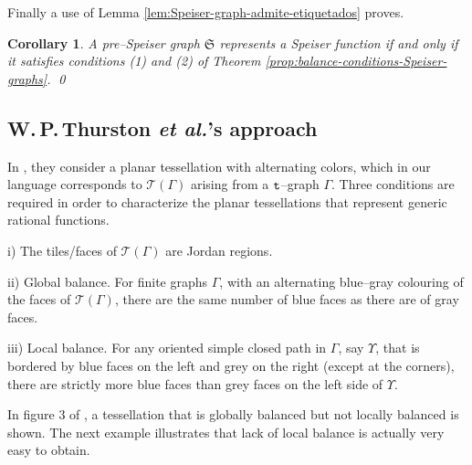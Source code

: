 \documentclass[final,3p,times]{elsarticle}
\newtheorem{corollary}[theorem]{Corollary}
\theoremstyle{definition}
\begin{document}
Finally a use of Lemma \ref{lem:Speiser-graph-admite-etiquetados} proves.

\begin{corollary}
A pre--Speiser graph $\mathfrak{S}$ represents a Speiser function
if and only if it satisfies conditions (1) and (2) of 
Theorem \ref{prop:balance-conditions-Speiser-graphs}.
\hfill\qed
\end{corollary}


\subsection{W.\,P.\,Thurston \emph{et al.}'s approach}
\label{sec:Koch-Lei}
In \cite{Koch-Lei}, they consider a planar tessellation with alternating colors, 
which in our language corresponds to
$\mathscr{T}(\Gamma)$ arising from a $\tt t$--graph 
$\Gamma$.
Three conditions are required 
in order to 
characterize the planar
tessellations that represent generic
rational functions.

\noindent 
i) The tiles/faces of $\mathscr{T}(\Gamma)$ 
are Jordan regions.

\noindent 
ii) Global balance. 
For finite graphs $\Gamma$, 
with an alternating blue--gray 
colouring of the faces of $\mathscr{T}(\Gamma)$, 
there are the same number of blue faces as there are of gray faces.

\noindent 
iii) Local balance. 
For any oriented simple closed path 
in $\Gamma$, say $\Upsilon$, that is bordered by blue faces on the left and grey on the right 
(except at the corners), 
there are strictly more blue faces than grey faces on the left side of $\Upsilon$.



In figure 3 of \cite{Koch-Lei},
a tessellation that is globally balanced but not locally 
balanced is shown.
The next example illustrates that lack of local balance is actually 
very easy to obtain.
\end{document}

